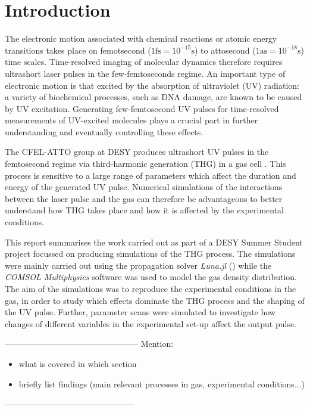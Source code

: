 \documentclass[a4paper]{jpconf}
\begin{document}
\section{Introduction}
The electronic motion associated with chemical reactions or atomic energy transitions takes place on femotsecond ($1 \text{fs} = 10^{-15} \text{s}$) to attosecond ($1 \text{as} = 10^{-18} \text{s}$) time scales. Time-resolved imaging of molecular dynamics therefore requires ultrashort laser pulses in the few-femtoseconds regime. An important type of electronic motion is that excited by the absorption of ultraviolet (UV) radiation: a variety of biochemical processes, such as DNA damage, are known to be caused by UV excitation. Generating few-femtosecond UV pulses for time-resolved measurements of UV-excited molecules plays a crucial part in further understanding and eventually controlling these effects. \par 
The CFEL-ATTO group at DESY produces ultrashort UV pulses in the femtosecond regime via third-harmonic generation (THG) in a gas cell \cite{galli2019}. This process is sensitive to a large range of parameters which affect the duration and energy of the generated UV pulse. Numerical simulations of the interactions between the laser pulse and the gas can therefore be advantageous to better understand how THG takes place and how it is affected by the experimental conditions. \par 
This report summarises the work carried out as part of a DESY Summer Student project focussed on producing simulations of the THG process. The simulations were mainly carried out using the propagation solver \textit{Luna.jl} (\cite{brahms2023}) while the \textit{COMSOL Multiphysics} software was used to model the gas density distribution. The aim of the simulations was to reproduce the experimental conditions in the gas, in order to study which effects dominate the THG process and the shaping of the UV pulse. Further, parameter scans were simulated to investigate how changes of different variables in the experimental set-up affect the output pulse. \par 
------------------------------------------------
Mention:
\begin{itemize}
\item what is covered in which section
\item briefly list findings (main relevant processes in gas, experimental conditions...)

\end{itemize}
-----------------------------------------------
\end{document}
